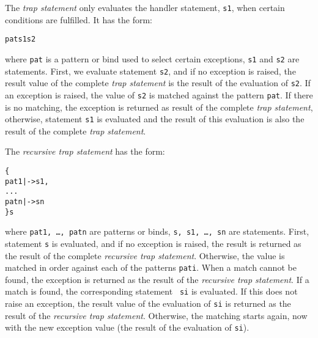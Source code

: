 \documentclass[\pformat,12pt]{article}
\begin{document}
\begin{description}
  The {\it trap statement\/} only evaluates the handler statement,
{\tt s1}, when certain conditions are fulfilled. It has the form:
\begin{alltt} 
     pat  s1  s2 
\end{alltt}
where {\tt pat} is a pattern or bind used to select certain
exceptions, {\tt s1} and {\tt s2} are statements. First, we evaluate
statement {\tt s2}, and if no exception is raised, the result value of
the complete {\it trap statement\/} is the result of the evaluation of
{\tt s2}. If an exception is raised, the value of {\tt s2} is matched
against the pattern {\tt pat}. If there is no matching, the exception
is returned as result of the complete {\it trap statement}, otherwise,
statement {\tt s1} is evaluated and the result of this evaluation is
also the result of the complete {\it trap statement}.

  The {\it recursive trap statement\/} has the form:
  \begin{alltt}
     \{
      pat1 |-> s1,
      ...
      patn |-> sn
    \}  s
  \end{alltt}
  where {\tt pat1, \ldots, patn} are patterns or binds, {\tt s, s1, \ldots,
    sn} are statements. First, statement {\tt s} is evaluated, and if no
  exception is raised, the result is returned as the result of the complete
  {\it recursive trap statement}. Otherwise, the value is matched in order
  against each of the patterns {\tt pati}. When a match cannot be found,
  the exception is returned as the result of the {\it recursive trap
    statement}. If a match is found, the corresponding statement {\tt
    si} is evaluated. If this does not raise an exception, the result value
  of the evaluation of {\tt si} is returned as the result of the {\it
    recursive trap statement}. Otherwise, the matching starts again, now
  with the new exception value (the result of the evaluation of {\tt si}).


\end{description}
\end{document}
